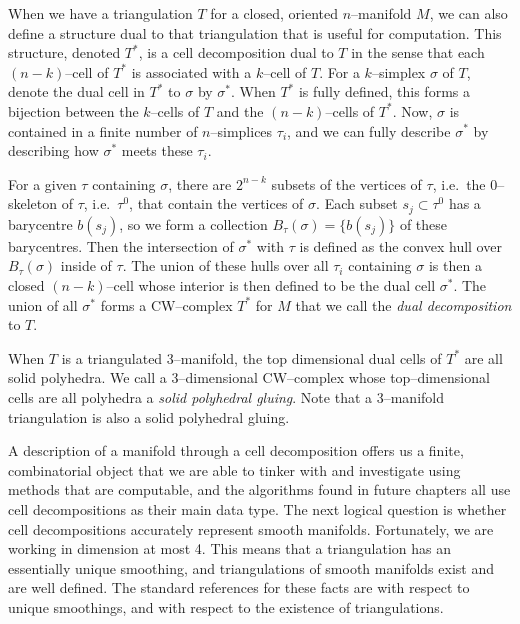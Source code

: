 \begin{defn}
  When we have a triangulation $T$ for a closed, oriented $n$--manifold $M$, we can also define a structure dual to that triangulation that is useful for computation.
  This structure, denoted $T^*$, is a cell decomposition dual to $T$ in the sense that each $(n-k)$--cell of $T^*$ is associated with a $k$--cell of $T$.
  For a $k$--simplex $\sigma$ of $T$, denote the dual cell in $T^*$ to $\sigma$ by $\sigma^*$.
  When $T^*$ is fully defined, this forms a bijection between the $k$--cells of $T$ and the $(n-k)$--cells of $T^*$.
  Now, $\sigma$ is contained in a finite number of $n$--simplices $\tau_i$, and we can fully describe $\sigma^*$ by describing how $\sigma^*$ meets these $\tau_i$.

  For a given $\tau$ containing $\sigma$, there are $2^{n-k}$ subsets of the vertices of $\tau$, i.e.\ the 0--skeleton of $\tau$, i.e.\ $\tau^0$, that contain the vertices of $\sigma$.
  Each subset $s_j\subset\tau^0$ has a barycentre $b(s_j)$, so we form a collection $B_\tau(\sigma)=\{b(s_j)\}$ of these barycentres.
  Then the intersection of $\sigma^*$ with $\tau$ is defined as the convex hull over $B_\tau(\sigma)$ inside of $\tau$.
  The union of these hulls over all $\tau_i$ containing $\sigma$ is then a closed $(n-k)$--cell whose interior is then defined to be the dual cell $\sigma^*$.
  The union of all $\sigma^*$ forms a CW--complex $T^*$ for $M$ that we call the \emph{dual decomposition} to $T$.
  
  When $T$ is a triangulated 3--manifold, the top dimensional dual cells of $T^*$ are all solid polyhedra.
  We call a 3--dimensional CW--complex whose top--dimensional cells are all polyhedra a \emph{solid polyhedral gluing}.
  Note that a 3--manifold triangulation is also a solid polyhedral gluing.
\end{defn}

A description of a manifold through a cell decomposition offers us a finite, combinatorial object that we are able to tinker with and investigate using methods that are computable, and the algorithms found in future chapters all use cell decompositions as their main data type.
The next logical question is whether cell decompositions accurately represent smooth manifolds.
Fortunately, we are working in dimension at most 4.
This means that a triangulation has an essentially unique smoothing, and triangulations of smooth manifolds exist and are well defined.
The standard references for these facts are \cite{HirsMazu} with respect to unique smoothings, and \cite{Whit40} with respect to the existence of triangulations.
